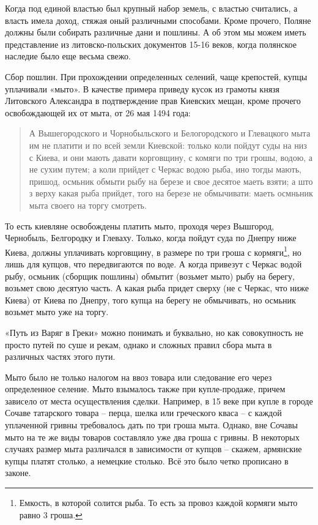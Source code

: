 Когда под единой властью был крупный набор земель, с властью считались, а власть имела доход, стяжая оный различными способами. Кроме прочего, Поляне должны были собирать различные дани и пошлины. А об этом мы можем иметь представление из литовско-польских документов 15-16 веков, когда полянское наследие было еще весьма свежо.

Сбор пошлин. При прохождении определенных селений, чаще крепостей, купцы уплачивали «мыто». В качестве примера приведу кусок из грамоты князя Литовского Александра в подтверждение прав Киевских мещан, кроме прочего освобождающей их от мыта, от 26 мая 1494 года:

\begin{quotation}
А Вышегородского и Чорнобыльского и Белогородского и Глевацкого мыта им не платити и по всей земли Киевской: только коли пойдут суды на низ с Киева, и они мають давати корговщину, с комяги по три грошы, водою, а не сухим путем; а коли прийдет с Черкас водою рыба, ино тогды мають, пришод, осмьник обмыти рыбу на березе и свое десятое маеть взяти; а што з верху какая рыба прийдет, того на березе не обмычивати: маеть осмньник мыта своего на торгу смотреть.
\end{quotation}

То есть киевляне освобождены платить мыто, проходя через Вышгород, Чернобыль, Белгородку и Глеваху. Только, когда пойдут суда по Днепру ниже Киева, должны уплачивать корговщину, в размере по три гроша с кормяги\footnote{Емкость, в которой солится рыба. То есть за провоз каждой кормяги мыто равно 3 гроша.}, но лишь для купцов, что передвигаются по воде. А когда привезут с Черкас водой рыбу, осмьник (сборщик пошлины) обмытит (возьмет мыто) рыбу на берегу, возьмет свою десятую часть. А какая рыба придет сверху (не с Черкас, что ниже Киева) от Киева по Днепру, того купца на берегу не обмычивать, но осмьник возьмет мыто уже на торгу.

«Путь из Варяг в Греки» можно понимать и буквально, но как совокупность не просто путей по суше и рекам, однако и сложных правил сбора мыта в различных частях этого пути.

Мыто было не только налогом на ввоз товара или следование его через определенное селение. Мыто взымалось также при купле-продаже, причем зависело от места осуществления сделки. Например, в 15 веке при купле в городе Сочаве татарского товара – перца, шелка или греческого кваса – с каждой уплаченной гривны требовалось дать по три гроша мыта. Однако, вне Сочавы мыто на те же виды товаров составляло уже два гроша с гривны. В некоторых случаях размер мыта различался в зависимости от купцов – скажем, армянские купцы платят столько, а немецкие столько. Всё это было четко прописано в законе.

